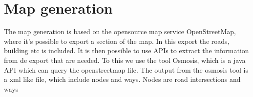 \section{Map generation}
The map generation is based on the opensource map service OpenStreetMap, where it's possible to export a section of the map. In this export the roads, building etc is included. It is then possible to use APIs to extract the information from de export that are needed. To this we use the tool Osmosis, which is a java API which can query the openstreetmap file.
The output from the osmosis tool is a xml like file, which include nodes and ways. Nodes are road intersections and ways 
